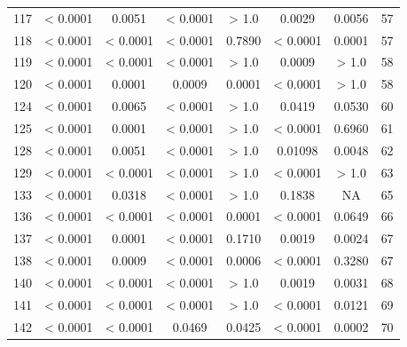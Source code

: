 {\begin{longtable}{cccccccc}
117 & {\color{red} < 0.0001} & {\color{red}0.0051} & {\color{red} < 0.0001} & > 1.0 & {\color{red}0.0029} & {\color{red}0.0056} & 57 \\
118 & {\color{red} < 0.0001} & {\color{red} < 0.0001} & {\color{red} < 0.0001} & 0.7890 & {\color{red} < 0.0001} & {\color{red}0.0001} & 57 \\
119 & {\color{red} < 0.0001} & {\color{red} < 0.0001} & {\color{red} < 0.0001} & > 1.0 & {\color{red}0.0009} & > 1.0 & 58 \\
120 & {\color{red} < 0.0001} & {\color{red}0.0001} & {\color{red}0.0009} & {\color{red}0.0001} & {\color{red} < 0.0001} & > 1.0 & 58 \\
124 & {\color{red} < 0.0001} & {\color{red}0.0065} & {\color{red} < 0.0001} & > 1.0 & {\color{red}0.0419} & 0.0530 & 60 \\
125 & {\color{red} < 0.0001} & {\color{red}0.0001} & {\color{red} < 0.0001} & > 1.0 & {\color{red} < 0.0001} & 0.6960 & 61 \\
128 & {\color{red} < 0.0001} & {\color{red}0.0051} & {\color{red} < 0.0001} & > 1.0 & {\color{red}0.01098} & {\color{red}0.0048} & 62 \\
129 & {\color{red} < 0.0001} & {\color{red} < 0.0001} & {\color{red} < 0.0001} & > 1.0 & {\color{red} < 0.0001} & > 1.0 & 63 \\
133 & {\color{red} < 0.0001} & {\color{red}0.0318} & {\color{red} < 0.0001} & > 1.0 & 0.1838 & NA & 65 \\
136 & {\color{red} < 0.0001} & {\color{red} < 0.0001} & {\color{red} < 0.0001} & {\color{red}0.0001} & {\color{red} < 0.0001} & 0.0649 & 66 \\
137 & {\color{red} < 0.0001} & {\color{red}0.0001} & {\color{red} < 0.0001} & 0.1710 & {\color{red}0.0019} & {\color{red}0.0024} & 67 \\
138 & {\color{red} < 0.0001} & {\color{red}0.0009} & {\color{red} < 0.0001} & {\color{red}0.0006} & {\color{red} < 0.0001} & 0.3280 & 67 \\
140 & {\color{red} < 0.0001} & {\color{red} < 0.0001} & {\color{red} < 0.0001} & > 1.0 & {\color{red}0.0019} & {\color{red}0.0031} & 68 \\
141 & {\color{red} < 0.0001} & {\color{red} < 0.0001} & {\color{red} < 0.0001} & > 1.0 & {\color{red} < 0.0001} & {\color{red}0.0121} & 69 \\
142 & {\color{red} < 0.0001} & {\color{red} < 0.0001} & {\color{red}0.0469} & {\color{red}0.0425} & {\color{red} < 0.0001} & {\color{red}0.0002} & 70 \\

\end{longtable}}
